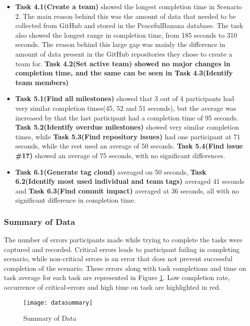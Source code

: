 \begin{itemize}
	\item \textbf{Task 4.1(Create a team)} showed the longest completion time in Scenario 2. The main reason behind this was the amount of data that needed to be collected from GitHub and stored in the PeacefulBanana database. The task also showed the longest range in completion time, from 185 seconds to 310 seconds. The reason behind this large gap was mainly the difference in amount of data present in the GitHub repositories they chose to create a team for. \textbf{Task 4.2(Set active team) showed no major changes in completion time, and the same can be seen in \textbf{Task 4.3(Identify team members)}}
	\item \textbf{Task 5.1(Find all milestones)} showed that 3 out of 4 participants had very similar completion times(45, 52 and 51 seconds), but the average was increased by that the last participant had a completion time of 95 seconds. \textbf{Task 5.2(Identify overdue milestones)} showed very similar completion times, while \textbf{Task 5.3(Find repository issues)} had one participant at 71 seconds, while the rest used an average of 50 seconds. \textbf{Task 5.4(Find issue \#17)} showed an average of 75 seconds, with no significant differences. 
	\item \textbf{Task 6.1(Generate tag cloud)} averaged on 50 seconds, \textbf{Task 6.2(Identify most used individual and team tags)} averaged 41 seconds and \textbf{Task 6.3(Find commit impact)} averaged at 36 seconds, all with no significant difference in completion time. 
\end{itemize}
\subsubsection{Summary of Data}
The number of errors participants made while trying to complete the tasks were captured and recorded. Critical errors leads to participant failing in completing scenario, while non-critical errors is an error that does not prevent successful completion of the scenario. These errors along with task completions and time on task average for each task are represented in Figure \ref{datasummary}.
Low completion rate, occurrence of critical-errors and high time on task are highlighted in red. 
\begin{figure}[h!]
    \centering
        \texttt{[image: datasummary]}
    \caption{Summary of Data}
    \label{datasummary}
\end{figure}

